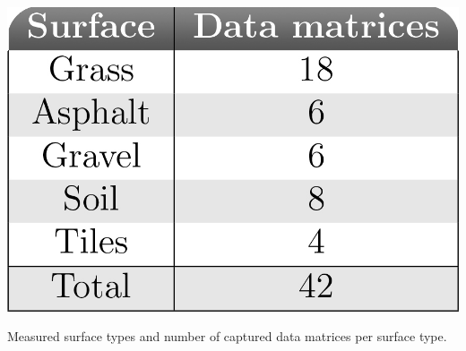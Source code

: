 \begin{table}[h]
	\centering
	\includegraphics[scale=0.7]{figs_temp/table_surfaces.jpg}
	\caption{Measured surface types and number of captured data matrices per surface type.} 
	\label{tab:count}
\end{table}

